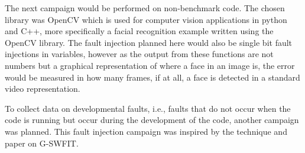 
The next campaign would be performed on non-benchmark code. The chosen library was OpenCV which is used for computer vision applications in python and C++, more specifically a facial recognition example written using the OpenCV library. The fault injection planned here would also be single bit fault injections in variables, however as the output from these functions are not numbers but a graphical representation of where a face in an image is, the error would be measured in how many frames, if at all, a face is detected in a standard video representation.

To collect data on developmental faults, i.e., faults that do not occur when the code is running but occur during the development of the code, another campaign was planned. This fault injection campaign was inspired by the technique and paper on G-SWFIT.

